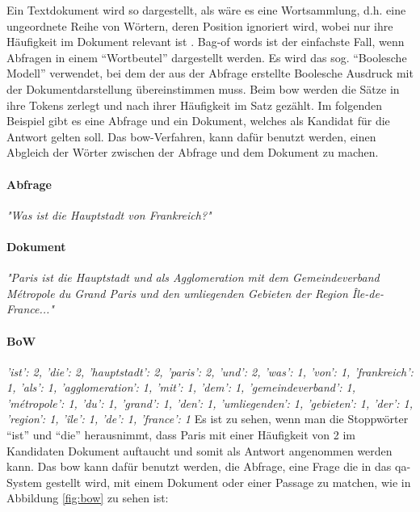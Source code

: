 \documentclass[
        ngerman,
        paper=a4,
        numbers=noendperiod,
]{scrreprt}
\begin{document}
    
Ein Textdokument wird so dargestellt, als wäre es eine Wortsammlung, d.h. eine ungeordnete Reihe von Wörtern, deren Position ignoriert wird, wobei nur ihre Häufigkeit im Dokument relevant ist \citep [S. 58]{Jurafsky2014SpeechProcessing}. 
Bag-of words ist der einfachste Fall, wenn Abfragen in einem \enquote{Wortbeutel} dargestellt werden.
Es wird das sog. \enquote{Boolesche Modell} verwendet, bei dem der aus der Abfrage erstellte Boolesche Ausdruck mit der Dokumentdarstellung übereinstimmen muss. Beim \ac{bow} werden die Sätze in ihre Tokens zerlegt und nach ihrer Häufigkeit im Satz gezählt. Im folgenden Beispiel gibt es eine Abfrage und ein Dokument, welches als Kandidat für die Antwort gelten soll. Das \ac{bow}-Verfahren, kann dafür benutzt werden, einen Abgleich der Wörter zwischen der Abfrage und dem Dokument zu machen. 

 \paragraph{Abfrage}
 \textit{"Was ist die Hauptstadt von Frankreich?"}

 \paragraph{Dokument}
 \textit{"Paris ist die Hauptstadt und als Agglomeration  mit dem Gemeindeverband Métropole du Grand Paris und den umliegenden Gebieten der  Region Île-de-France..."}

 \paragraph{BoW}
 \textit{'ist': 2, 'die': 2, 'hauptstadt': 2, 'paris': 2, 'und': 2, 
    'was': 1, 'von': 1, 'frankreich': 1, 'als': 1, 'agglomeration': 1, 
    'mit': 1, 'dem': 1, 'gemeindeverband': 1, 'métropole': 1, 'du': 1, 
    'grand': 1, 'den': 1, 'umliegenden': 1, 'gebieten': 1, 'der': 1, 
    'region': 1, 'île': 1, 'de': 1, 'france': 1}
\newline
\newline
Es ist zu sehen, wenn man die Stoppwörter \enquote{ist} und \enquote{die} herausnimmt, dass Paris mit einer Häufigkeit von 2 im Kandidaten Dokument auftaucht und somit als Antwort angenommen werden kann. Das \ac{bow} kann dafür benutzt werden, die Abfrage, eine Frage die in das \ac{qa}-System gestellt wird, mit einem Dokument oder einer Passage zu matchen, wie in Abbildung \ref{fig:bow} zu sehen ist: 
\end{document}
